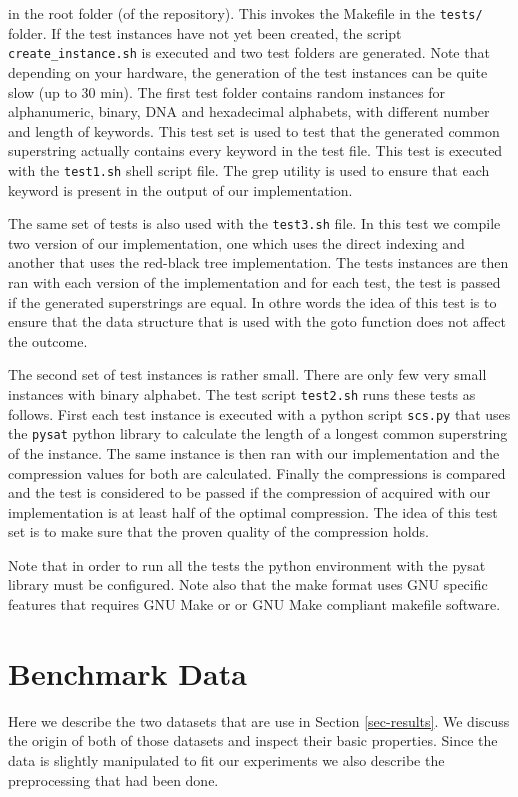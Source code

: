 \documentclass[english,twoside,censored,csm,algorithms-track-2020]{HYthesisML}
\theoremstyle{plain}
\theoremstyle{definition}
\begin{document}
in the root folder (of the repository). This invokes the Makefile in the \texttt{tests/} folder. If the
test instances have not yet been created, the script \texttt{create\_instance.sh} is executed and two
test folders are generated. Note that depending on your hardware, the generation of the test instances
can be quite slow (up to 30 min).
The first test folder contains random instances for alphanumeric, binary,
DNA and hexadecimal alphabets, with different number and length of keywords. This test set is used
to test that the generated common superstring actually contains every keyword in the test file. This
test is executed with the \texttt{test1.sh} shell script file. The grep utility is used to ensure
that each keyword is present in the output of our implementation. 

The same set of tests is also used with the \texttt{test3.sh} file. In this test we compile two version
of our implementation, one which uses the direct indexing and another that uses the red-black tree
implementation. The tests instances are then ran with each version of the implementation and for each
test, the test is passed if the generated superstrings are equal. In othre words the idea of this
test is to ensure that the data structure that is used with the goto function does not affect
the outcome.

The second set of test instances is rather small. There are only few very small instances with binary
alphabet. The test script \texttt{test2.sh} runs these tests as follows. First each test instance is
executed with a python script \texttt{scs.py} that uses the \texttt{pysat} python library to calculate
the length of a longest common superstring of the instance. The same instance is then ran with our
implementation and the compression values for both are calculated. Finally the compressions is compared
and the test is considered to be passed if the compression of acquired with our implementation is
at least half of the optimal compression. The idea of this test set is to make sure that the proven
quality of the compression holds.

Note that in order to run all the tests the python environment with the pysat library must be configured.
Note also that the make format uses GNU specific features that requires GNU Make or or GNU Make compliant
makefile software. 



\section{Benchmark Data}
Here we describe the two datasets that are use in Section \ref{sec-results}. We discuss the origin
of both of those datasets and inspect their basic properties. Since the data is slightly manipulated
to fit our experiments we also describe the preprocessing that had been done.
\end{document}
